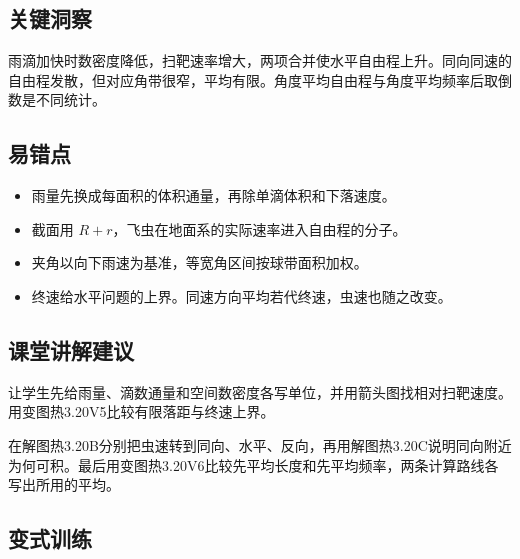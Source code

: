 \documentclass[UTF8,fontset=fandol,a4paper,11pt]{ctexart}
\begin{document}

\subsection*{关键洞察}

雨滴加快时数密度降低，扫靶速率增大，两项合并使水平自由程上升。同向同速的自由程发散，但对应角带很窄，平均有限。角度平均自由程与角度平均频率后取倒数是不同统计。



\subsection*{易错点}

\begin{itemize}
\item 雨量先换成每面积的体积通量，再除单滴体积和下落速度。
\item 截面用 $R+r$，飞虫在地面系的实际速率进入自由程的分子。
\item 夹角以向下雨速为基准，等宽角区间按球带面积加权。
\item 终速给水平问题的上界。同速方向平均若代终速，虫速也随之改变。
\end{itemize}



\subsection*{课堂讲解建议}

让学生先给雨量、滴数通量和空间数密度各写单位，并用箭头图找相对扫靶速度。用变图热3.20V5比较有限落距与终速上界。

在解图热3.20B分别把虫速转到同向、水平、反向，再用解图热3.20C说明同向附近为何可积。最后用变图热3.20V6比较先平均长度和先平均频率，两条计算路线各写出所用的平均。



\subsection*{变式训练}
\end{document}
